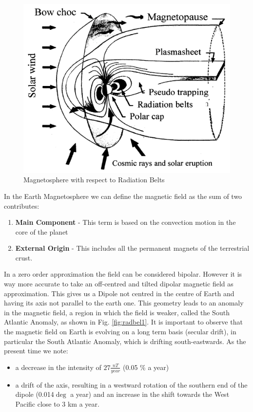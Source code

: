 \documentclass[./dissertation.tex]{subfiles}
\begin{document}
\begin{figure}[h!]
\centering
  \includegraphics[scale = 0.30]{Figures/magnetosphere.png}
  \caption{Magnetosphere with respect to Radiation Belts \cite{bib2}}
  \label{fig:magnetosphere}
\end{figure}

In the Earth Magnetosphere we can define the magnetic field as the sum of two contributes:
\begin{enumerate}
    \item \textbf{Main Component} - This term is based on the convection motion in the core of the planet
    \item \textbf{External Origin} - This includes all the permanent magnets of the terrestrial crust.
\end{enumerate}

In a zero order approximation the field can be considered bipolar. However it is way more accurate to take an off-centred and tilted dipolar magnetic field as approximation. This gives us a Dipole not centred in the centre of Earth and having its axis not parallel to the earth one. This geometry leads to an anomaly in the magnetic field, a region in which the  field is weaker, called the South Atlantic Anomaly, as shown in Fig. \ref{fig:radbel1}. It is important to observe that the magnetic field on Earth is evolving on a long term basis (secular drift), in particular the South Atlantic Anomaly, which is drifting south-eastwards. As the present time we note:
\begin{itemize}
    \item a decrease in the intensity of $27\frac{nT}{year}$ (0.05 \% a year) \cite{bib2}
    \item a drift of the axis, resulting in a westward rotation of the
southern end of the dipole (0.014$\deg$ a year) and an increase in
the shift towards the West Pacific close to 3 km a year. \cite{bib2}
\end{itemize}
\end{document}
